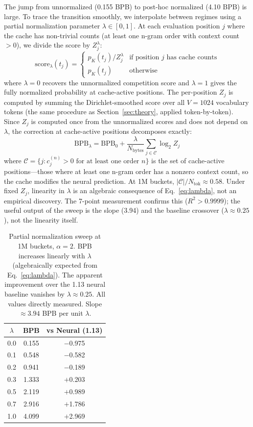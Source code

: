 \documentclass[11pt]{article}
\begin{document}
The jump from unnormalized (0.155 BPB) to post-hoc normalized (4.10 BPB) is large. To trace the transition smoothly, we interpolate between regimes using a partial normalization parameter $\lambda \in [0, 1]$. At each evaluation position $j$ where the cache has non-trivial counts (at least one n-gram order with context count $>0$), we divide the score by $Z_j^\lambda$:
\[
\text{score}_\lambda(t_j) = \begin{cases} p_K(t_j) / Z_j^\lambda & \text{if position } j \text{ has cache counts} \\ p_K(t_j) & \text{otherwise} \end{cases}
\]
where $\lambda = 0$ recovers the unnormalized competition score and $\lambda = 1$ gives the fully normalized probability at cache-active positions. The per-position $Z_j$ is computed by summing the Dirichlet-smoothed score over all $V = 1024$ vocabulary tokens (the same procedure as Section~\ref{sec:theory}, applied token-by-token). Since $Z_j$ is computed once from the unnormalized scores and does not depend on $\lambda$, the correction at cache-active positions decomposes exactly:
\begin{equation}
\text{BPB}_\lambda = \text{BPB}_0 + \frac{\lambda}{N_{\text{bytes}}} \sum_{j \in \mathcal{C}} \log_2 Z_j
\label{eq:lambda}
\end{equation}
where $\mathcal{C} = \{j : c^{(n)}_j > 0 \text{ for at least one order } n\}$ is the set of cache-active positions---those where at least one n-gram order has a nonzero context count, so the cache modifies the neural prediction. At 1M buckets, $|\mathcal{C}|/N_{\text{tok}} \approx 0.58$. Under fixed $Z_j$, linearity in $\lambda$ is an algebraic consequence of Eq.~\ref{eq:lambda}, not an empirical discovery. The 7-point measurement confirms this ($R^2 > 0.9999$); the useful output of the sweep is the slope (3.94) and the baseline crossover ($\lambda \approx 0.25$), not the linearity itself.

\begin{table}[h]
\centering
\caption{Partial normalization sweep at 1M buckets, $\alpha = 2$. BPB increases linearly with $\lambda$ (algebraically expected from Eq.~\ref{eq:lambda}). The apparent improvement over the 1.13 neural baseline vanishes by $\lambda \approx 0.25$. All values directly measured. Slope $\approx 3.94$ BPB per unit $\lambda$.}
\label{tab:lambda}
\begin{tabular}{ccc}
\toprule
$\lambda$ & BPB & vs Neural (1.13) \\
\midrule
0.0 & 0.155 & $-$0.975 \\
0.1 & 0.548 & $-$0.582 \\
0.2 & 0.941 & $-$0.189 \\
0.3 & 1.333 & $+$0.203 \\
0.5 & 2.119 & $+$0.989 \\
0.7 & 2.916 & $+$1.786 \\
1.0 & 4.099 & $+$2.969 \\
\bottomrule
\end{tabular}
\end{table}
\end{document}
